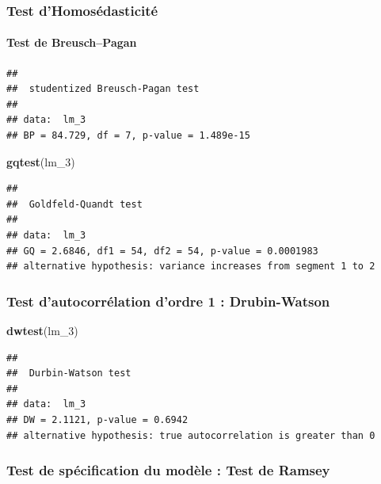 \documentclass[french,]{article}
\newenvironment{Shaded}{\begin{snugshade}}{\end{snugshade}}
\newcommand{\DecValTok}[1]{\textcolor[rgb]{0.00,0.00,0.81}{#1}}
\newcommand{\KeywordTok}[1]{\textcolor[rgb]{0.13,0.29,0.53}{\textbf{#1}}}
\newcommand{\NormalTok}[1]{#1}
\let\oldparagraph\paragraph
\renewcommand{\paragraph}[1]{\oldparagraph{#1}\mbox{}}
\begin{document}
\hypertarget{test-dhomosuxe9dasticituxe9}{%
\subsubsection{Test
d'Homosédasticité}\label{test-dhomosuxe9dasticituxe9}}

\hypertarget{test-de-breuschpagan}{%
\paragraph{Test de Breusch--Pagan}\label{test-de-breuschpagan}}

\begin{verbatim}
## 
##  studentized Breusch-Pagan test
## 
## data:  lm_3
## BP = 84.729, df = 7, p-value = 1.489e-15
\end{verbatim}

\begin{Shaded}
\begin{Highlighting}[]
\KeywordTok{gqtest}\NormalTok{(lm_}\DecValTok{3}\NormalTok{)}
\end{Highlighting}
\end{Shaded}

\begin{verbatim}
## 
##  Goldfeld-Quandt test
## 
## data:  lm_3
## GQ = 2.6846, df1 = 54, df2 = 54, p-value = 0.0001983
## alternative hypothesis: variance increases from segment 1 to 2
\end{verbatim}

\hypertarget{test-dautocorruxe9lation-dordre-1-drubin-watson}{%
\subsubsection{Test d'autocorrélation d'ordre 1 :
Drubin-Watson}\label{test-dautocorruxe9lation-dordre-1-drubin-watson}}

\begin{Shaded}
\begin{Highlighting}[]
\KeywordTok{dwtest}\NormalTok{(lm_}\DecValTok{3}\NormalTok{)}
\end{Highlighting}
\end{Shaded}

\begin{verbatim}
## 
##  Durbin-Watson test
## 
## data:  lm_3
## DW = 2.1121, p-value = 0.6942
## alternative hypothesis: true autocorrelation is greater than 0
\end{verbatim}

\hypertarget{test-de-spuxe9cification-du-moduxe8le-test-de-ramsey}{%
\subsubsection{Test de spécification du modèle : Test de
Ramsey}\label{test-de-spuxe9cification-du-moduxe8le-test-de-ramsey}}
\end{document}
